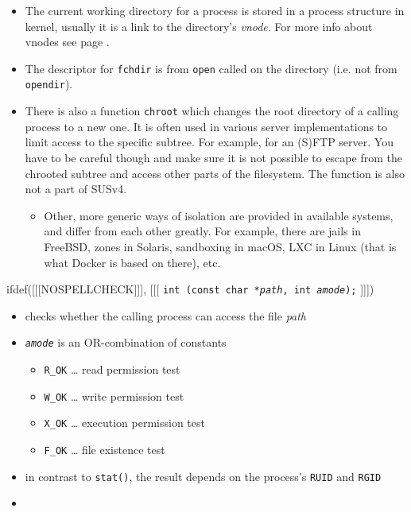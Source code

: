 \begin{itemize}
\item The current working directory for a process is stored in a process
structure in kernel, usually it is a link to the directory's \emph{vnode}.
For more info about vnodes see page \pageref{VFS}.
\item The descriptor for \texttt{fchdir} is from \texttt{open} called on the
directory (i.e. not from \texttt{opendir}).
\item There is also a function \texttt{chroot} which changes the root
directory of a calling process to a new one.  It is often used in various server
implementations to limit access to the specific subtree.  For example, for an
(S)FTP server.  You have to be careful though and make sure it is not possible to
escape from the chrooted subtree and access other parts of the filesystem.  The
function is also not a part of SUSv4.
\begin{itemize}
\item Other, more generic ways of isolation are provided in available systems,
and differ from each other greatly.  For example, there are jails in Free\-BSD,
zones in Solaris, sandboxing in macOS, LXC in Linux (that is what Docker is
based on there), etc.
\end{itemize}
\end{itemize}



\begin{slide}
ifdef([[[NOSPELLCHECK]]], [[[
\texttt{int (const char *\emph{path}, int \emph{amode});}
]]])
\begin{itemize}
\item checks whether the calling process can access the file \emph{path}
\item \emph{\texttt{amode}} is an OR-combination of constants
    \begin{itemize}
    \item \verb#R_OK# \dots{} read permission test
    \item \verb#W_OK# \dots{} write permission test
    \item \verb#X_OK# \dots{} execution permission test
    \item \verb#F_OK# \dots{} file existence test
    \end{itemize}
\item in contrast to \texttt{stat()}, the result depends on the process's
\texttt{RUID} and \texttt{RGID}
\item {}
\end{itemize}
\end{slide}

